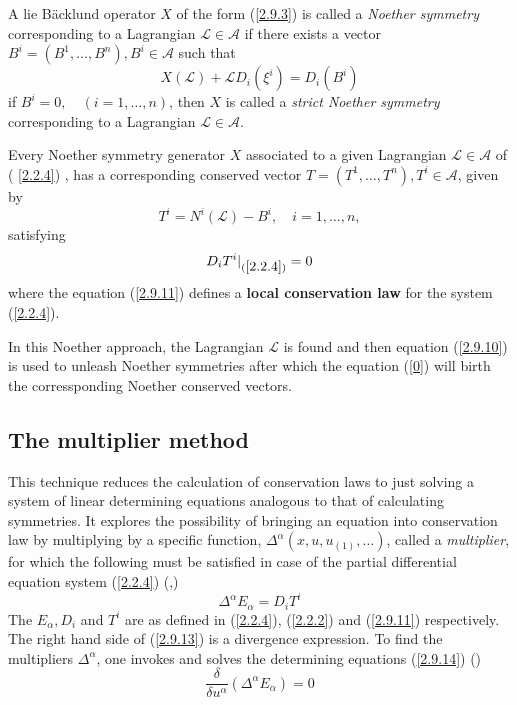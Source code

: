 \begin{defn}
\begin{defn}
\begin{defn} A lie B\"acklund operator $X$ of the form (\ref{2.9.3}) is called a\textit{ Noether symmetry} corresponding to  a Lagrangian $ \mathcal{L} \in \mathcal{A} $ if there exists a vector $ B^i = ( B^1, \ldots, B^n), B^i \in \mathcal{A}$ such that \begin{equation} X(\mathcal{L}) + \mathcal{L} D_i( \xi^i) = D_i(B^i) \label{2.9.10}
	\end{equation} if $ B^i=0,\quad ( i = 1,\ldots,n)$, then $X$ is called a \textit{strict Noether symmetry }corresponding to a Lagrangian $ \mathcal{L} \in \mathcal{A}$.
\end{defn}
\begin{thm}  Every Noether symmetry generator $X$ associated to a given Lagrangian $ \mathcal{L} \in \mathcal{A}$  of ( \ref{2.2.4}) , has a  corresponding conserved vector $ T = ( T^1, \ldots, T^n), T^i \in \mathcal{A} $, given by 
	\begin{equation}
	T^i = N^i( \mathcal{L})-B^i, \quad i=1, \ldots, n, \label{0}
	\end{equation} satisfying \begin{equation} D_i T^i|_{(\ref{2.2.4})}=0
	\label{2.9.11}	\end{equation} where the equation (\ref{2.9.11}) defines a\textbf{ local conservation law} for the system (\ref{2.2.4}).
\end{thm}
\begin{rem}
	In this Noether approach, the Lagrangian $\mathcal{L}$ is found and then equation (\ref{2.9.10}) is used to unleash Noether symmetries after which the equation (\ref{0}) will birth the corressponding Noether conserved vectors.
\end{rem}
\subsection{The multiplier method}
\cite{naz2012conservation}
This technique reduces the calculation of conservation laws to just solving a system of linear determining equations analogous to that of calculating symmetries. It explores the possibility of bringing an equation into conservation law by multiplying by  a specific function,  $ \Delta^{\alpha} ( x, u,u_{(1)}, \ldots)$,  called a \textit{multiplier}, for which the following must be satisfied in case of the partial differential equation system (\ref{2.2.4})  (\cite{olver2000applications},\citep{bluman2010applications})
\begin{equation}  \Delta^{\alpha} E_{\alpha} = D_iT^i \label{2.9.13}
\end{equation} The $E_{\alpha}, D_i $ and $T^i $ are as defined in (\ref{2.2.4}), (\ref{2.2.2}) and (\ref{2.9.11}) respectively. The right hand side of (\ref{2.9.13}) is a divergence expression. To find the multipliers $\Delta^{\alpha}$, one invokes and solves the determining equations (\ref{2.9.14}) (\cite{bluman2008symmetry}) \begin{equation} \frac{ \delta }{ \delta u^{\alpha}} ( \Delta^{\alpha} E_{\alpha} )=0 \label{2.9.14}
\end{equation}


\end{defn}
\end{defn}
